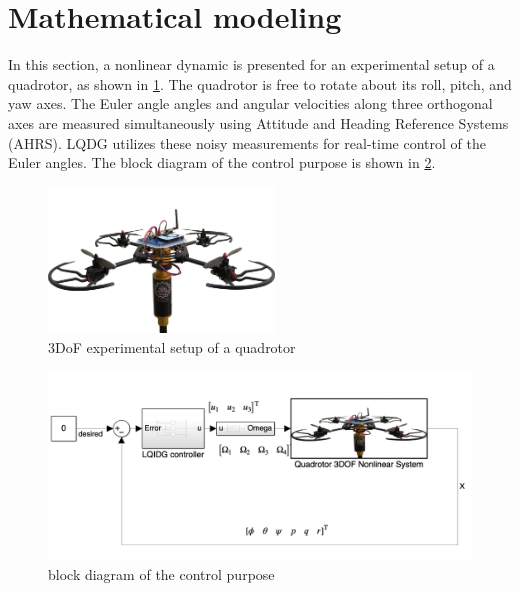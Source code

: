 \documentclass[conference]{IEEEtran}
\begin{document}
\section{Mathematical modeling}
In this section, a nonlinear dynamic is presented for an experimental setup of a quadrotor, as shown in \figurename{\ref{quadlab}}.
The quadrotor is free to rotate about its roll, pitch, and yaw axes. The Euler angle angles and angular velocities along three orthogonal axes are measured simultaneously using Attitude and Heading Reference Systems (AHRS). LQDG utilizes these noisy measurements for real-time control of the Euler angles. The block diagram of the control purpose is shown in \figurename{\ref{block_diagram}}.
\begin{figure}[!h]
	\includegraphics[width=6cm]{../Figures/introduction/3DOFQuad.png}
	\centering
	\caption{3DoF experimental setup of a quadrotor}
	\label{quadlab}
\end{figure}
\begin{figure}[!h]
	\includegraphics[width=.9\linewidth]{../Figures/introduction/block_diagram.png}
	\centering
	\caption{block diagram of the control purpose}
	\label{block_diagram}
\end{figure}
\end{document}
